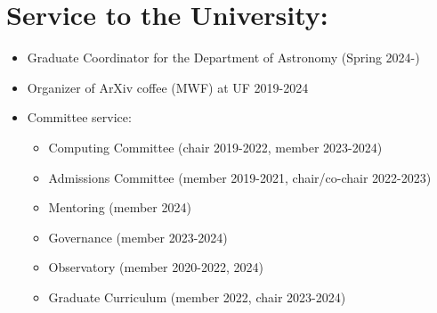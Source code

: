 \begin{minipage}{\textwidth}
\section*{Service to the University:}
\vspace{-10pt}
\begin{itemize}
    \item Graduate Coordinator for the Department of Astronomy (Spring 2024-)
    \item Organizer of ArXiv coffee (MWF) at UF 2019-2024
    \item Committee service:
        \begin{itemize}
                \item Computing Committee (chair 2019-2022, member 2023-2024)
                \item Admissions Committee (member 2019-2021, chair/co-chair 2022-2023)
                \item Mentoring (member 2024)
                \item Governance (member 2023-2024)
                \item Observatory (member 2020-2022, 2024)
                \item Graduate Curriculum (member 2022, chair 2023-2024)
            \end{itemize}
\itemsep-3pt
\end{itemize}
\end{minipage}
\vspace{4mm}
